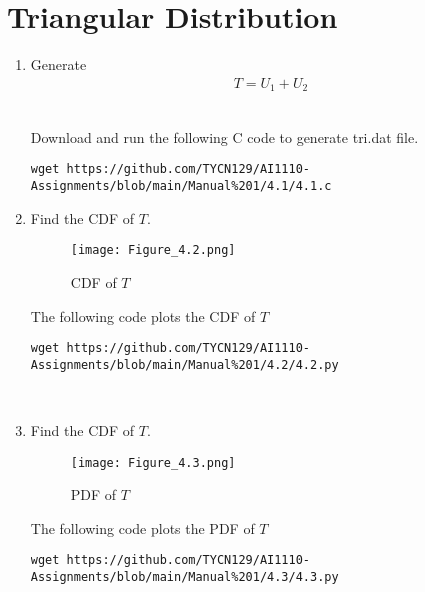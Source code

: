 \documentclass[journal,12pt,twocolumn]{IEEEtran}
\renewcommand\thesection{\arabic{section}}
\begin{document}
\section{Triangular Distribution}
\begin{enumerate}[label=\thesection.\arabic*
,ref=\thesection.\theenumi]
    \item Generate
    \begin{align}
        T = U_1 + U_2
    \end{align}

\solution\\
Download and run the following C code to generate tri.dat file.
\begin{lstlisting}
wget https://github.com/TYCN129/AI1110-Assignments/blob/main/Manual%201/4.1/4.1.c
\end{lstlisting}
\item Find the CDF of $T$.\\
\solution
\begin{figure}[h!]
    \centering
    \texttt{[image: Figure\_4.2.png]}
    \caption{CDF of $T$}
    \label{fig:my_label}
\end{figure}

The following code plots the CDF of $T$
\begin{lstlisting}
wget https://github.com/TYCN129/AI1110-Assignments/blob/main/Manual%201/4.2/4.2.py
\end{lstlisting}
\\
\item Find the CDF of $T$.\\
\solution
\begin{figure}[H]
    \centering
    \texttt{[image: Figure\_4.3.png]}
    \caption{PDF of $T$}
    \label{fig:my_label}
\end{figure}
The following code plots the PDF of $T$
\begin{lstlisting}
wget https://github.com/TYCN129/AI1110-Assignments/blob/main/Manual%201/4.3/4.3.py
\end{lstlisting}


\end{enumerate}
\end{document}
